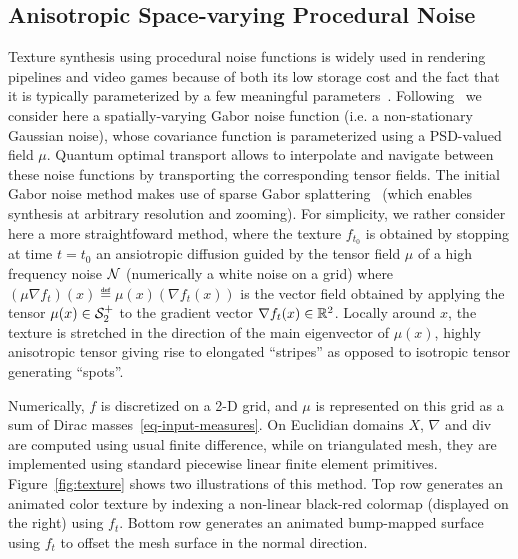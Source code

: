
\subsection{Anisotropic Space-varying Procedural Noise}




Texture synthesis using procedural noise functions is widely used in rendering pipelines and video games because of both its low storage cost and the fact that it is typically parameterized by a few meaningful parameters~\cite{LagaeSurvey}. 
%
Following~\cite{LagaImproving} we consider here a spatially-varying Gabor noise function (i.e. a non-stationary Gaussian noise), whose covariance function is parameterized using a PSD-valued field $\mu$. 
%
Quantum optimal transport allows to interpolate and navigate between these noise functions by transporting the corresponding tensor fields. 
%
The initial Gabor noise method makes use of sparse Gabor splattering~\cite{LagaeSurvey} (which enables synthesis at arbitrary resolution and zooming). For simplicity, we rather consider here a more straightfoward method, where the texture $f_{t_0}$ is obtained by stopping at time $t=t_0$ an ansiotropic diffusion guided by the tensor field $\mu$  of a high frequency noise $\mathcal{N}$ (numerically a white noise on a grid)
where $(\mu \nabla f_t)(x) \eqdef \mu(x) (\nabla f_t(x))$ is the vector field obtained by applying the tensor $\mu(x) \in \mathcal{S}_2^+$ to the gradient vector $\nabla f_t(x) \in \mathbb{R}^2$. 
%
Locally around $x$, the texture is stretched in the direction of the main eigenvector of $\mu(x)$,  highly anisotropic tensor giving rise to elongated ``stripes'' as opposed to isotropic tensor generating ``spots''. 

Numerically, $f$ is discretized on a 2-D grid, and $\mu$ is represented on this grid as a sum of Dirac masses~\eqref{eq-input-measures}. On Euclidian domains $X$, $\nabla$ and div are computed using usual finite difference, while on triangulated mesh, they are implemented using standard piecewise linear finite element primitives. 
%
Figure~\ref{fig:texture} shows two illustrations of this method. Top row generates an animated color texture by indexing a non-linear black-red colormap (displayed on the right) using $f_t$. Bottom row generates an animated bump-mapped surface using $f_t$ to offset the mesh surface in the normal direction. 


